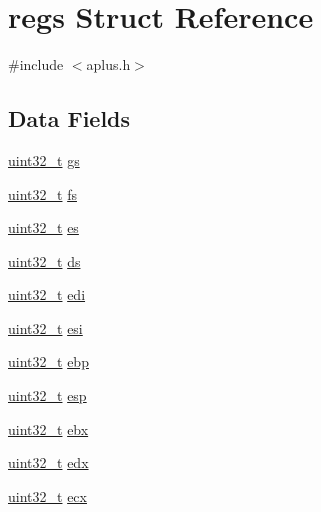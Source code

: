 \hypertarget{structregs}{\section{regs Struct Reference}
\label{structregs}
}


{\ttfamily \#include $<$aplus.\+h$>$}

\subsection*{Data Fields}
\begin{DoxyCompactItemize}
\item 
\hyperlink{aplus_8h_a53a0df51603c77c2aa5b9ea61b606a82}{uint32\+\_\+t} \hyperlink{structregs_a0fd3992a1d7ba82600e1e03bf5466ce8}{gs}
\item 
\hyperlink{aplus_8h_a53a0df51603c77c2aa5b9ea61b606a82}{uint32\+\_\+t} \hyperlink{structregs_a0974815767aa327833ce6beac16858d5}{fs}
\item 
\hyperlink{aplus_8h_a53a0df51603c77c2aa5b9ea61b606a82}{uint32\+\_\+t} \hyperlink{structregs_aede6adc8400a3e68071ad7a038fbbcc9}{es}
\item 
\hyperlink{aplus_8h_a53a0df51603c77c2aa5b9ea61b606a82}{uint32\+\_\+t} \hyperlink{structregs_aa29daa3553339a188913853a1d91e30a}{ds}
\item 
\hyperlink{aplus_8h_a53a0df51603c77c2aa5b9ea61b606a82}{uint32\+\_\+t} \hyperlink{structregs_a2b436d52440963797508f228cd45c207}{edi}
\item 
\hyperlink{aplus_8h_a53a0df51603c77c2aa5b9ea61b606a82}{uint32\+\_\+t} \hyperlink{structregs_a88723011f6b017490ee8bc7fc9a3235c}{esi}
\item 
\hyperlink{aplus_8h_a53a0df51603c77c2aa5b9ea61b606a82}{uint32\+\_\+t} \hyperlink{structregs_a1b38213d82714658dfd95ba5427f7f7b}{ebp}
\item 
\hyperlink{aplus_8h_a53a0df51603c77c2aa5b9ea61b606a82}{uint32\+\_\+t} \hyperlink{structregs_a7c44c0dc13f854e06e6cc509ba6e9054}{esp}
\item 
\hyperlink{aplus_8h_a53a0df51603c77c2aa5b9ea61b606a82}{uint32\+\_\+t} \hyperlink{structregs_a41a7a63387c4bb590af33d8ee3cb5a42}{ebx}
\item 
\hyperlink{aplus_8h_a53a0df51603c77c2aa5b9ea61b606a82}{uint32\+\_\+t} \hyperlink{structregs_a63133abf1974301855fe69ef4ee70ef3}{edx}
\item 
\hyperlink{aplus_8h_a53a0df51603c77c2aa5b9ea61b606a82}{uint32\+\_\+t} \hyperlink{structregs_a63c6a54e49cb7c0035440d0fda58a63b}{ecx}
\item 

\end{DoxyCompactItemize}

